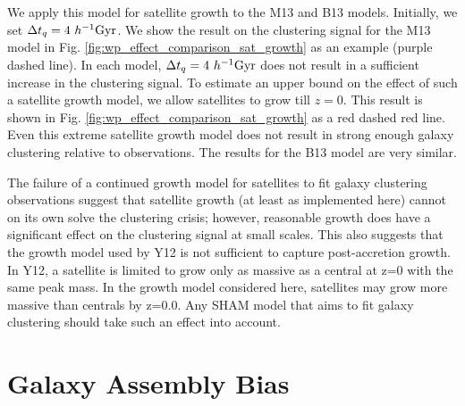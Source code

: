 \documentclass[a4paper,fleqn,usenatbib]{mnras}
\begin{document}
We apply this model for satellite growth to the M13 and B13 models.  Initially, we set $\Delta t_{q}=4 ~h^{-1}{\rm Gyr}$.  We show the result on the clustering signal for the M13 model in Fig. \ref{fig:wp_effect_comparison_sat_growth} as an example (purple dashed line).  In each model, $\Delta t_{q}=4 ~h^{-1}{\rm Gyr}$ does not result in a sufficient increase in the clustering signal.  To estimate an upper bound on the effect of such a satellite growth model, we allow satellites to grow till $z=0$.  This result is shown in Fig. \ref{fig:wp_effect_comparison_sat_growth} as a red dashed red line.  Even this extreme satellite growth model does not result in strong enough galaxy clustering relative to observations.  The results for the B13 model are very similar.  

The failure of a continued growth model for satellites to fit galaxy clustering observations suggest that satellite growth (at least as implemented here) cannot on its own solve the clustering crisis; however, reasonable growth does have a significant effect on the clustering signal at small scales.  This also suggests that the growth model used by Y12 is not sufficient to capture post-accretion growth.  In Y12, a satellite is limited to grow only as massive as a central at z=0 with the same peak mass.  In the growth model considered here, satellites may grow more massive than centrals by z=0.0.  Any SHAM model that aims to fit galaxy clustering should take such an effect into account.  


\section{Galaxy Assembly Bias}
\label{sec:assem_bias} 
\end{document}
